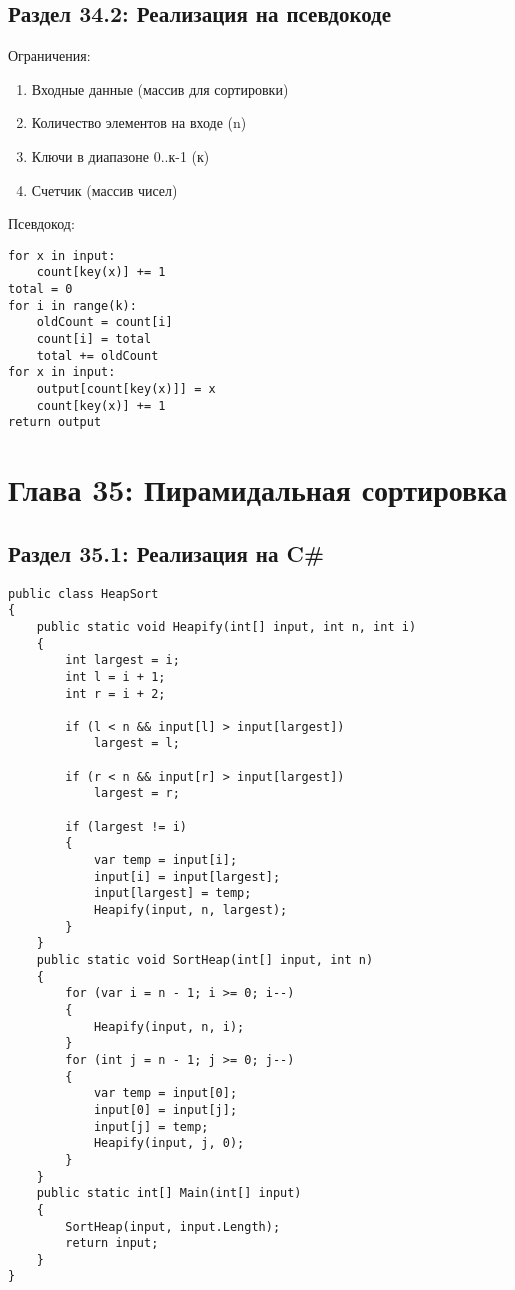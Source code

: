 \section*{Раздел 34.2: Реализация на псевдокоде} 

\vspace{\baselineskip}
Ограничения:

\vspace{\baselineskip}
\begin{enumerate}
\item Входные данные (массив для сортировки)
\item Количество элементов на входе (n)
\item Ключи в диапазоне 0..к-1 (к)
\item Счетчик (массив чисел)
\end{enumerate}

\vspace{\baselineskip}
Псевдокод:

\vspace{\baselineskip}
\begin{tcolorbox}
\begin{verbatim} 
for x in input:
	count[key(x)] += 1
total = 0
for i in range(k):
	oldCount = count[i]
	count[i] = total
	total += oldCount
for x in input:
	output[count[key(x)]] = x
	count[key(x)] += 1
return output
\end{verbatim}
\end{tcolorbox}

\chapter*{Глава 35: Пирамидальная сортировка}
\section*{Раздел 35.1: Реализация на C\#} 

\vspace{\baselineskip}
\begin{tcolorbox}
\begin{verbatim} 
public class HeapSort
{
	public static void Heapify(int[] input, int n, int i)
	{
		int largest = i;
		int l = i + 1;
		int r = i + 2;
		
		if (l < n && input[l] > input[largest])
			largest = l;
			
		if (r < n && input[r] > input[largest])
			largest = r;
			
		if (largest != i)
		{
			var temp = input[i];
			input[i] = input[largest];
			input[largest] = temp;
			Heapify(input, n, largest);
		}
	}
	public static void SortHeap(int[] input, int n)
	{
		for (var i = n - 1; i >= 0; i--)
		{
			Heapify(input, n, i);
		}
		for (int j = n - 1; j >= 0; j--)
		{
			var temp = input[0];
			input[0] = input[j];
			input[j] = temp;
			Heapify(input, j, 0);
		}
	}
	public static int[] Main(int[] input)
	{
		SortHeap(input, input.Length);
		return input;
	}
}
\end{verbatim}
\end{tcolorbox}

